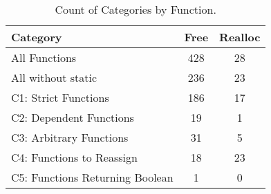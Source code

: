 \begin{table}[H]
  \centering
   \begin{tabularx}{.7\linewidth}{l|c|c}

      Category & Free & Realloc \\
      \hline

      All Functions& 428 & 28 \\

      All without static& 236 & 23 \\

      C1: Strict Functions& 186 & 17 \\

      C2: Dependent Functions& 19 & 1 \\

      C3: Arbitrary Functions& 31 & 5 \\

      C4: Functions to Reassign& 18 & 23 \\

      C5: Functions Returning Boolean& 1 & 0 \\

   \end{tabularx}
   \caption{Count of Categories by Function.}
   \label{tab:categories:overview}
\end{table}

